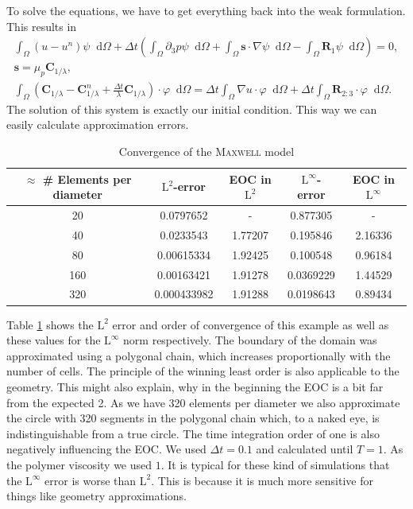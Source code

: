 \documentclass[12pt,a4paper,twoside, open=right]{scrreprt}
\theoremstyle{definition}
\theoremstyle{plain}
\newcommand{\bfs}{\bm{s}}
\newcommand{\bfC}{\bm{C}}
\newcommand{\bfR}{\bm{R}}
\newcommand{\D}{\mathop{}\!\mathrm{d}}
\begin{document}
To solve the equations, we have to get everything back into the weak formulation. This results in 
\begin{align}
\int_\Omega(u-u^n)\psi\D\Omega +\Delta t\left(\int_\Omega\partial_3 p\psi\D\Omega + \int_\Omega\bfs\cdot\nabla\psi\D\Omega-\int_\Omega \bfR_1\psi\D\Omega\right) = 0,\\
\bfs =\mu_p\bfC_{1/\lambda},\\
\int_\Omega(\bfC_{1/\lambda} - \bfC_{1/\lambda}^n +\frac{\Delta t}{\lambda}\bfC_{1/\lambda})\cdot\varphi\D\Omega = 
\Delta t\int_\Omega \nabla u\cdot\varphi\D\Omega+\Delta t\int_{\Omega}\bfR_{2:3}\cdot\varphi\D\Omega.
\end{align}
The solution of this system is exactly our initial condition. This way we can easily calculate approximation errors. 
\begin{table}
    \centering
    \begin{tabular}{c|c|c|c|c}
        $\approx$ \# Elements per diameter& $\mathrm{L}^2$-error&EOC in $\mathrm{L}^2$&$\mathrm{L}^\infty$-error &EOC in $\mathrm{L}^\infty$\\
        \hline
        20 & 0.0797652 & - & 0.877305 & -\\
        40 & 0.0233543 & 1.77207 & 0.195846 & 2.16336\\
        80 & 0.00615334 & 1.92425 & 0.100548 & 0.96184\\
        160 & 0.00163421 & 1.91278 & 0.0369229 & 1.44529\\
        320 & 0.000433982 & 1.91288 & 0.0198643 & 0.89434
    \end{tabular}
    \caption{Convergence of the \textsc{Maxwell} model}
    \label{tab:maxwellconv}
\end{table}

Table \ref{tab:maxwellconv} shows the $\mathrm{L}^2$ error and order of convergence of this example as well as these values for the $\mathrm{L}^\infty$ norm respectively. The boundary of the domain was approximated using a polygonal chain, which increases proportionally with the number of cells. The principle of the winning least order is also applicable to the geometry. This might also explain, why in the beginning the EOC is a bit far from the expected 2. As we have 320 elements per diameter we also approximate the circle with 320 segments in the polygonal chain which, to a naked eye, is indistinguishable from a true circle. The time integration order of one is also negatively influencing the EOC. We used $\Delta t = 0.1$ and calculated until $T=1$. As the polymer viscosity we used $1$. It is typical for these kind of simulations that the $\mathrm{L}^\infty$ error is worse than $\mathrm{L}^2$. This is because it is much more sensitive for things like geometry approximations.
\end{document}
